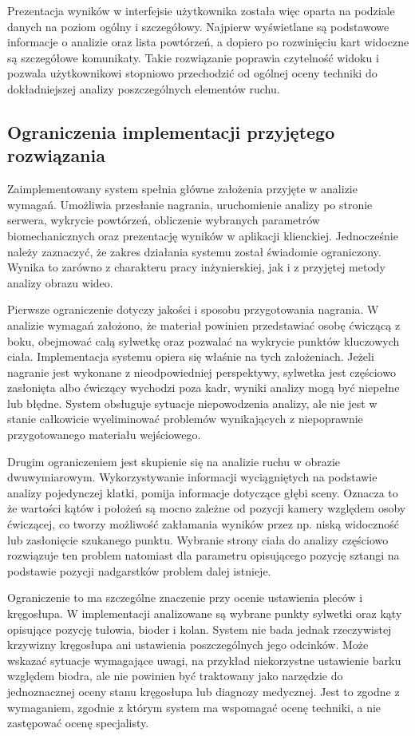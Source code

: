 Prezentacja wyników w interfejsie użytkownika została więc oparta na podziale danych na poziom ogólny i szczegółowy. Najpierw wyświetlane są podstawowe informacje o analizie oraz lista powtórzeń, a dopiero po rozwinięciu kart widoczne są szczegółowe komunikaty. Takie rozwiązanie poprawia czytelność widoku i pozwala użytkownikowi stopniowo przechodzić od ogólnej oceny techniki do dokładniejszej analizy poszczególnych elementów ruchu.

\subsection{Ograniczenia implementacji przyjętego rozwiązania}

Zaimplementowany system spełnia główne założenia przyjęte w analizie wymagań. Umożliwia przesłanie nagrania, uruchomienie analizy po stronie serwera, wykrycie powtórzeń, obliczenie wybranych parametrów biomechanicznych oraz prezentację wyników w aplikacji klienckiej. Jednocześnie należy zaznaczyć, że zakres działania systemu został świadomie ograniczony. Wynika to zarówno z charakteru pracy inżynierskiej, jak i z przyjętej metody analizy obrazu wideo.

Pierwsze ograniczenie dotyczy jakości i sposobu przygotowania nagrania. W analizie wymagań założono, że materiał powinien przedstawiać osobę ćwiczącą z boku, obejmować całą sylwetkę oraz pozwalać na wykrycie punktów kluczowych ciała. Implementacja systemu opiera się właśnie na tych założeniach. Jeżeli nagranie jest wykonane z nieodpowiedniej perspektywy, sylwetka jest częściowo zasłonięta albo ćwiczący wychodzi poza kadr, wyniki analizy mogą być niepełne lub błędne. System obsługuje sytuacje niepowodzenia analizy, ale nie jest w stanie całkowicie wyeliminować problemów wynikających z niepoprawnie przygotowanego materiału wejściowego.

Drugim ograniczeniem jest skupienie się na analizie ruchu w obrazie dwuwymiarowym. Wykorzystywanie informacji wyciągniętych na podstawie analizy pojedynczej klatki, pomija informacje dotyczące głębi sceny. Oznacza to że wartości kątów i położeń są mocno zależne od pozycji kamery względem osoby ćwiczącej, co tworzy możliwość zakłamania wyników przez np. niską widoczność lub zasłonięcie szukanego punktu. Wybranie strony ciała do analizy częściowo rozwiązuje ten problem natomiast dla parametru opisującego pozycję sztangi na podstawie pozycji nadgarstków problem dalej istnieje.

Ograniczenie to ma szczególne znaczenie przy ocenie ustawienia pleców i kręgosłupa. W implementacji analizowane są wybrane punkty sylwetki oraz kąty opisujące pozycję tułowia, bioder i kolan. System nie bada jednak rzeczywistej krzywizny kręgosłupa ani ustawienia poszczególnych jego odcinków. Może wskazać sytuacje wymagające uwagi, na przykład niekorzystne ustawienie barku względem biodra, ale nie powinien być traktowany jako narzędzie do jednoznacznej oceny stanu kręgosłupa lub diagnozy medycznej. Jest to zgodne z wymaganiem, zgodnie z którym system ma wspomagać ocenę techniki, a nie zastępować ocenę specjalisty.

